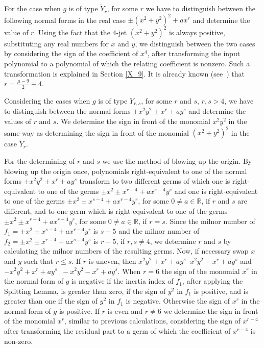 \documentclass[noend]{amsproc}
\theoremstyle{definition}
\DeclareMathOperator{\requiv}{\overset{r}{\sim}}
\begin{document}
For the case when $g$ is of type $\widetilde Y_r$, for some $r$ we have to
distinguish between the following normal forms in the real case
$\pm(x^2+y^2)^2+ax^r$ and determine the value of $r$. Using the fact that the
$4$-jet $(x^2+y^2)^2$ is always positive, substituting any real numbers for $x$
and $y$,  we distinguish between the two cases by considering the sign of the coefficient of $x^4$, after transforming the input polynomial to a polynomial of which the relating coefficient is nonzero. Such a transformation is explained in Section \ref{X_9}. It is
already known (see~\cite{AVG1985}) that $r=\frac{\mu-9}{2}+4$.

Considering the cases when $g$ is of type $Y_{r,s}$, for some $r$ and $s$,
$r,s>4$, we have to distinguish between the normal forms $\pm x^2y^2\pm
x^r+ay^s$ and determine the values of $r$ and $s$.  We determine the sign in
front of the monomial $x^2y^2$ in the same way as determining the sign in front
of the monomial $(x^2+y^2)^2$ in the case $\widetilde Y_r$.

For the determining of $r$ and $s$ we use the method of blowing up the origin.
By blowing up the origin once, polynomials right-equivalent to one of the
normal forms $\pm x^2y^2\pm x^r+ay^s$ transform to two different germs of which
one is right-equivalent to one of the germs $\pm x^2\pm x^{r-4}+ax^{s-4}y^s$
and one is right-equivalent to one of the germs  $\pm x^2\pm
x^{s-4}+ax^{r-4}y^r$, for some $0\neq a\in \mathbb R$, if $r$ and $s$ are
different, and to one germ which is right-equivalent to one of the germs $\pm
x^2\pm x^{r-4}+ax^{r-4}y^r$, for some $0\neq a\in\mathbb R$, if  $r=s$. Since
the milnor number of $f_1=\pm x^2\pm x^{s-4}+ax^{r-4}y^r$ is $s-5$ and the
milnor number of $f_2=\pm x^2\pm x^{r-4}+ax^{s-4}y^s$  is $r-5$, if $r,s\neq
4$, we determine $r$ and $s$ by calculating the milnor numbers of the resulting
germs. Now, if necessary swap $x$ and $y$ such that $r\le s$. If $r$ is uneven,
then $x^2y^2+x^{r}+ay^s\requiv x^2y^2- x^{r}+ay^s$ and
$-x^2y^2+x^{r}+ay^s\requiv -x^2y^2- x^{r}+ay^s$. When $r=6$ the sign of the
monomial $x^r$ in the normal form of $g$ is negative if the inertia index of
$f_1$, after applying the Splitting Lemma, is greater than zero, if the sign of
$y^2$ in $f_1$ is positive, and is greater than one if the sign of $y^2$ in
$f_1$ is negative. Otherwise the sign of $x^r$ in the normal form of $g$ is
positive. If $r$ is even and $r\neq 6$ we determine the sign in front of the
monomial $x^r$, similar to previous calculations, considering the sign of $x^{r-4}$
after transforming the residual part to a germ of which the coefficient of $x^{r-4}$ is non-zero.
\end{document}
